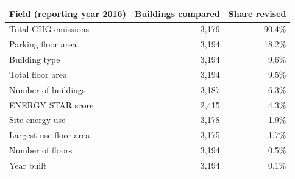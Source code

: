 \begin{tabular}{lrr}
\toprule
Field (reporting year 2016) & Buildings compared & Share revised \\
\midrule
Total GHG emissions & 3,179 & 90.4\% \\
Parking floor area & 3,194 & 18.2\% \\
Building type & 3,194 & 9.6\% \\
Total floor area & 3,194 & 9.5\% \\
Number of buildings & 3,187 & 6.3\% \\
ENERGY STAR score & 2,415 & 4.3\% \\
Site energy use & 3,178 & 1.9\% \\
Largest-use floor area & 3,175 & 1.7\% \\
Number of floors & 3,194 & 0.5\% \\
Year built & 3,194 & 0.1\% \\
\bottomrule
\end{tabular}
